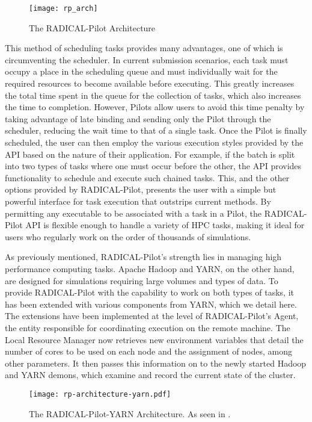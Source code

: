 \documentclass[]{article}
\begin{document}
		\begin{figure}[H]
			\centering
			\texttt{[image: rp\_arch]}
			\caption{The RADICAL-Pilot Architecture \cite{rp_arch}}
			\label{fig:rp_architecture}
		\end{figure}

		This method of scheduling tasks provides many advantages, one of which is circumventing the scheduler. In current submission scenarios, each task must occupy a place in the scheduling queue and must individually wait for the required resources to become available before executing. This greatly increases the total time spent in the queue for the collection of tasks, which also increases the time to completion. However, Pilots allow users to avoid this time penalty by taking advantage of late binding and sending only the Pilot through the scheduler, reducing the wait time to that of a single task. Once the Pilot is finally scheduled, the user can then employ the various execution styles provided by the API based on the nature of their application. For example, if the batch is split into two types of tasks where one must occur before the other, the API provides functionality to schedule and execute such chained tasks. This, and the other options provided by RADICAL-Pilot, presents the user with a simple but powerful interface for task execution that outstrips current methods. By permitting any executable to be associated with a task in a Pilot, the RADICAL-Pilot API is flexible enough to handle a variety of HPC tasks, making it ideal for users who regularly work on the order of thousands of simulations.

		As previously mentioned, RADICAL-Pilot's strength lies in managing high performance computing tasks. Apache Hadoop and YARN, on the other hand, are designed for simulations requiring large volumes and types of data. To provide RADICAL-Pilot with the capability to work on both types of tasks, it has been extended with various components from YARN, which we detail here. The extensions have been implemented at the level of RADICAL-Pilot's Agent, the entity responsible for coordinating execution on the remote machine. The Local Resource Manager now retrieves new environment variables that detail the number of cores to be used on each node and the assignment of nodes, among other parameters. It then passes this information on to the newly started Hadoop and YARN demons, which examine and record the current state of the cluster.

		\begin{figure}[H]
			\centering
			\texttt{[image: rp-architecture-yarn.pdf]}
			\caption{The RADICAL-Pilot-YARN Architecture. As seen in \cite{hadoop_paper}.}
			\label{fig:rp_yarn_arch}
		\end{figure}
\end{document}
